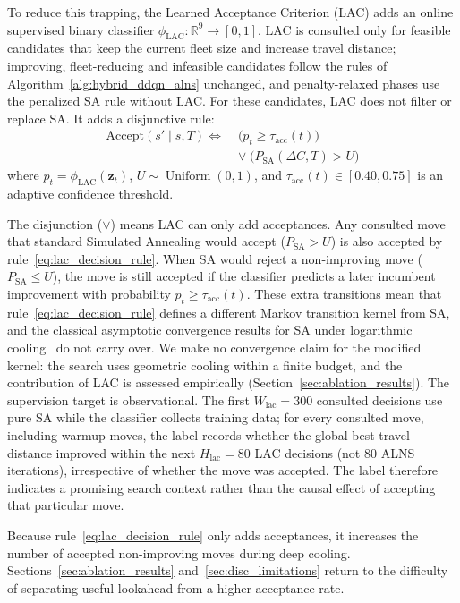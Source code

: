 \documentclass{ieeeaccess}
\begin{document}
To reduce this trapping, the Learned Acceptance Criterion (LAC) adds an online supervised binary classifier $\phi_{\text{LAC}}: \mathbb{R}^9 \to [0, 1]$. LAC is consulted only for feasible candidates that keep the current fleet size and increase travel distance; improving, fleet-reducing and infeasible candidates follow the rules of Algorithm~\ref{alg:hybrid_ddqn_alns} unchanged, and penalty-relaxed phases use the penalized SA rule without LAC. For these candidates, LAC does not filter or replace SA. It adds a disjunctive rule:
\begin{equation}
\begin{aligned}
  \text{Accept}(s' \mid s, T) \iff \; &\Big( p_t \ge \tau_{\text{acc}}(t) \Big) \\
  &\lor\; \Big( P_{\text{SA}}(\Delta C, T) > U \Big)
\end{aligned}
\label{eq:lac_decision_rule}
\end{equation}
where $p_t = \phi_{\text{LAC}}(\mathbf{z}_t)$, $U \sim \operatorname{Uniform}(0, 1)$, and $\tau_{\text{acc}}(t) \in [0.40, 0.75]$ is an adaptive confidence threshold.

The disjunction ($\lor$) means LAC can only add acceptances. Any consulted move that standard Simulated Annealing would accept ($P_{\text{SA}} > U$) is also accepted by rule~\eqref{eq:lac_decision_rule}. When SA would reject a non-improving move ($P_{\text{SA}} \le U$), the move is still accepted if the classifier predicts a later incumbent improvement with probability $p_t \ge \tau_{\text{acc}}(t)$. These extra transitions mean that rule~\eqref{eq:lac_decision_rule} defines a different Markov transition kernel from SA, and the classical asymptotic convergence results for SA under logarithmic cooling~\cite{hajek1988cooling} do not carry over. We make no convergence claim for the modified kernel: the search uses geometric cooling within a finite budget, and the contribution of LAC is assessed empirically (Section~\ref{sec:ablation_results}). The supervision target is observational. The first $W_{\text{lac}} = 300$ consulted decisions use pure SA while the classifier collects training data; for every consulted move, including warmup moves, the label records whether the global best travel distance improved within the next $H_{\text{lac}} = 80$ LAC decisions (not 80 ALNS iterations), irrespective of whether the move was accepted. The label therefore indicates a promising search context rather than the causal effect of accepting that particular move.

Because rule~\eqref{eq:lac_decision_rule} only adds acceptances, it increases the number of accepted non-improving moves during deep cooling. Sections~\ref{sec:ablation_results} and~\ref{sec:disc_limitations} return to the difficulty of separating useful lookahead from a higher acceptance rate.
\end{document}
